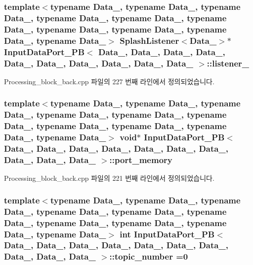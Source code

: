 \subsubsection[{\texorpdfstring{listener\+\_\+4}{listener_4}}]{\setlength{\rightskip}{0pt plus 5cm}template$<$typename Data\+\_, typename Data\+\_, typename Data\+\_, typename Data\+\_, typename Data\+\_, typename Data\+\_, typename Data\+\_, typename Data\+\_, typename Data\+\_, typename Data\+\_$>$ {\bf Splash\+Listener}$<$Data\+\_$>$$\ast$ {\bf Input\+Data\+Port\+\_\+\+PB}$<$ Data\+\_, Data\+\_, Data\+\_, Data\+\_, Data\+\_, Data\+\_, Data\+\_, Data\+\_, Data\+\_, Data\+\_ $>$\+::listener\+\_}\hypertarget{classInputDataPort__PB_a89c99b63027e15f821a9859d3b988173}{}\label{classInputDataPort__PB_a89c99b63027e15f821a9859d3b988173}


Processing\+\_\+block\+\_\+back.\+cpp 파일의 227 번째 라인에서 정의되었습니다.

\subsubsection[{\texorpdfstring{port\+\_\+memory}{port_memory}}]{\setlength{\rightskip}{0pt plus 5cm}template$<$typename Data\+\_, typename Data\+\_, typename Data\+\_, typename Data\+\_, typename Data\+\_, typename Data\+\_, typename Data\+\_, typename Data\+\_, typename Data\+\_, typename Data\+\_$>$ void$\ast$ {\bf Input\+Data\+Port\+\_\+\+PB}$<$ Data\+\_, Data\+\_, Data\+\_, Data\+\_, Data\+\_, Data\+\_, Data\+\_, Data\+\_, Data\+\_, Data\+\_ $>$\+::port\+\_\+memory}\hypertarget{classInputDataPort__PB_a3f273b7df3b5eb322a422a7d8b80a05f}{}\label{classInputDataPort__PB_a3f273b7df3b5eb322a422a7d8b80a05f}


Processing\+\_\+block\+\_\+back.\+cpp 파일의 221 번째 라인에서 정의되었습니다.

\subsubsection[{\texorpdfstring{topic\+\_\+number}{topic_number}}]{\setlength{\rightskip}{0pt plus 5cm}template$<$typename Data\+\_, typename Data\+\_, typename Data\+\_, typename Data\+\_, typename Data\+\_, typename Data\+\_, typename Data\+\_, typename Data\+\_, typename Data\+\_, typename Data\+\_$>$ int {\bf Input\+Data\+Port\+\_\+\+PB}$<$ Data\+\_, Data\+\_, Data\+\_, Data\+\_, Data\+\_, Data\+\_, Data\+\_, Data\+\_, Data\+\_, Data\+\_ $>$\+::topic\+\_\+number =0}\hypertarget{classInputDataPort__PB_ae994da4cf26fd15afa7e3c6ac90aa159}{}\label{classInputDataPort__PB_ae994da4cf26fd15afa7e3c6ac90aa159}


